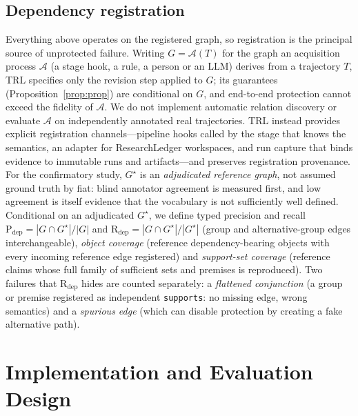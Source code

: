 \documentclass[journal]{IEEEtran}
\begin{document}
\subsection{Dependency registration}
\label{sec:registration}
Everything above operates on the registered graph, so registration is the principal source of unprotected failure. Writing $G=\mathcal{A}(T)$ for the graph an acquisition process $\mathcal{A}$ (a stage hook, a rule, a person or an LLM) derives from a trajectory $T$, TRL specifies only the revision step applied to $G$; its guarantees (Proposition~\ref{prop:prop}) are conditional on $G$, and end-to-end protection cannot exceed the fidelity of $\mathcal{A}$. We do not implement automatic relation discovery or evaluate $\mathcal{A}$ on independently annotated real trajectories. TRL instead provides explicit registration channels---pipeline hooks called by the stage that knows the semantics, an adapter for ResearchLedger workspaces, and run capture that binds evidence to immutable runs and artifacts---and preserves registration provenance. For the confirmatory study, $G^\star$ is an \emph{adjudicated reference graph}, not assumed ground truth by fiat: blind annotator agreement is measured first, and low agreement is itself evidence that the vocabulary is not sufficiently well defined. Conditional on an adjudicated $G^\star$, we define typed precision and recall $\mathrm{P}_{\mathrm{dep}}=|G\cap G^\star|/|G|$ and $\mathrm{R}_{\mathrm{dep}}=|G\cap G^\star|/|G^\star|$ (group and alternative-group edges interchangeable), \emph{object coverage} (reference dependency-bearing objects with every incoming reference edge registered) and \emph{support-set coverage} (reference claims whose full family of sufficient sets and premises is reproduced). Two failures that $\mathrm{R}_{\mathrm{dep}}$ hides are counted separately: a \emph{flattened conjunction} (a group or premise registered as independent \texttt{supports}: no missing edge, wrong semantics) and a \emph{spurious edge} (which can disable protection by creating a fake alternative path).

\section{Implementation and Evaluation Design}
\label{sec:design}
\end{document}
